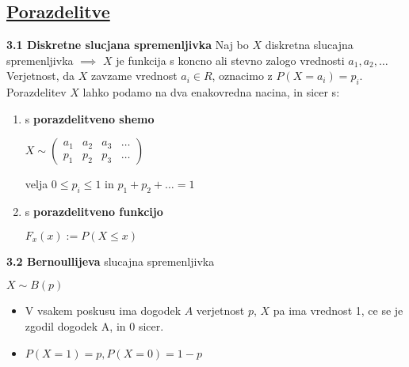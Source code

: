\documentclass{article}
\begin{document}
\begin{multicols}{3}
\section{\underline{Porazdelitve}}

\textbf{3.1 Diskretne slucjana spremenljivka}
Naj bo $X$ diskretna slucajna spremenljivka $\implies$ $X$ je funkcija
s koncno ali stevno zalogo  vrednosti ${ a_{1}, a_{2}, \dots}$ Verjetnost, 
da $X$ zavzame vrednost $a_{i} \in R$, oznacimo z $P(X = a_{i}) = p_{i}$. Porazdelitev
$X$ lahko podamo na dva enakovredna nacina, in sicer s:
\begin{enumerate}
    \item s \textbf{porazdelitveno shemo}
        \begin{center}
            \begin{math}
                X \sim
                \begin{pmatrix}
                    a_{1} & a_{2} & a_{3} & \dots \\
                    p_{1} & p_{2} & p_{3} & \dots
                \end{pmatrix}
            \end{math}
        \end{center}
        velja $0 \leq p_{i} \leq 1$ in $p_{1} + p_{2} + \dots = 1$
    \item s \textbf{porazdelitveno funkcijo}
        \begin{center}
            \begin{math}
                F_{x}(x) := P(X \leq x)
            \end{math}
        \end{center}
\end{enumerate}

\textbf{3.2 Bernoullijeva} slucajna spremenljivka
\begin{center}
    \begin{math}
        X \sim B(p)
    \end{math}
\end{center}
\begin{itemize}
    \item V vsakem poskusu ima dogodek $A$ verjetnost $p$, $X$ pa ima vrednost 1, ce se je zgodil dogodek A, in 0 sicer.
    \item $P(X = 1) = p, P(X = 0) = 1 - p$
\end{itemize}



\end{multicols}
\end{document}
